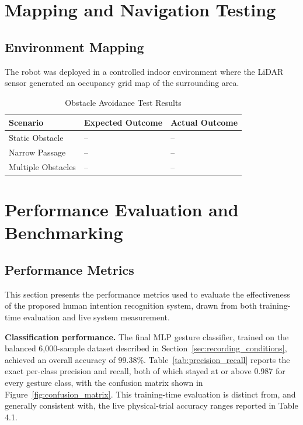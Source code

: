 \section{Mapping and Navigation Testing}

\subsection{Environment Mapping}

The robot was deployed in a controlled indoor environment where the LiDAR sensor generated an occupancy grid map of the surrounding area.

\begin{table}[H]
\centering
\caption{Obstacle Avoidance Test Results}
\label{tab:obstacle_avoidance}
\begin{tabular}{|l|l|l|}
\hline
\textbf{Scenario} & \textbf{Expected Outcome} & \textbf{Actual Outcome} \\
\hline
Static Obstacle & -- & -- \\
\hline
Narrow Passage & -- & -- \\
\hline
Multiple Obstacles & -- & -- \\
\hline
\end{tabular}
\end{table}
\section{Performance Evaluation and Benchmarking}

\subsection{Performance Metrics}

This section presents the performance metrics used to evaluate the effectiveness of the proposed human intention recognition system, drawn from both training-time evaluation and live system measurement.

\textbf{Classification performance.} 
The final MLP gesture classifier, trained on the
balanced 6,000-sample dataset described in Section~\ref{sec:recording_conditions},
achieved an overall accuracy of 99.38\%. Table~\ref{tab:precision_recall} reports the
exact per-class precision and recall, both of which stayed at or above 0.987 for
every gesture class, with the confusion matrix shown in
Figure~\ref{fig:confusion_matrix}. This training-time evaluation is distinct from,
and generally consistent with, the live physical-trial accuracy ranges reported in
Table 4.1.

